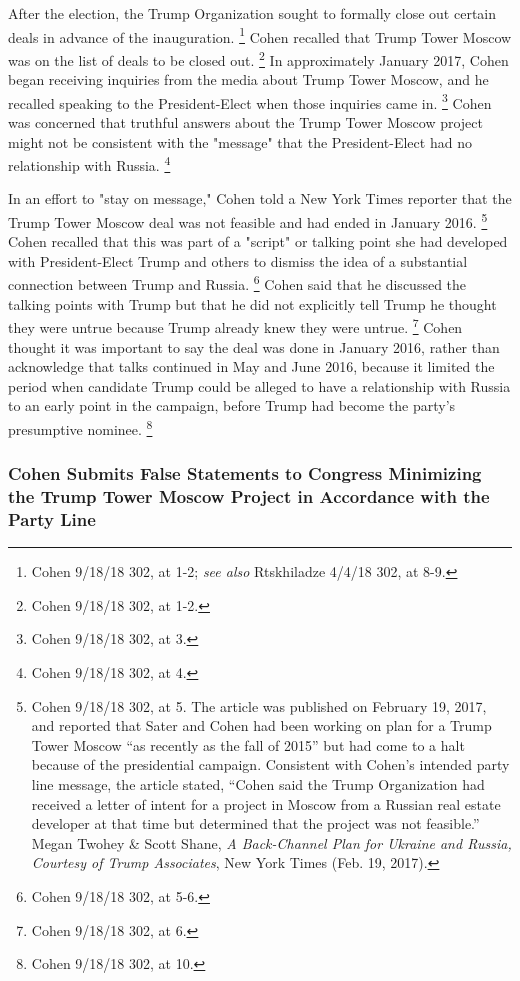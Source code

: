 {After the election, the Trump Organization sought to formally close out certain deals in advance of the inauguration.%
\footnote{Cohen 9/18/18 302, at 1-2;
\textit{see also} Rtskhiladze 4/4/18 302, at 8-9.}
Cohen recalled that Trump Tower Moscow was on the list of deals to be closed out.%
\footnote{Cohen 9/18/18 302, at 1-2.}
In approximately January 2017, Cohen began receiving inquiries from the media about Trump Tower Moscow, and he recalled speaking to the President-Elect when those inquiries came in.%
\footnote{Cohen 9/18/18 302, at 3.}
Cohen was concerned that truthful answers about the Trump Tower Moscow project might not be consistent with the "message" that the President-Elect had no relationship with Russia.%
\footnote{Cohen 9/18/18 302, at 4.}

In an effort to "stay on message," Cohen told a New York Times reporter that the Trump Tower Moscow deal was not feasible and had ended in January 2016.%
\footnote{Cohen 9/18/18 302, at 5.
The article was published on February 19, 2017, and reported that Sater and Cohen had been working on plan for a Trump Tower Moscow “as recently as the fall of 2015” but had come to a halt because of the presidential campaign.
Consistent with Cohen’s intended party line message, the article stated, “Cohen said the Trump Organization had received a letter of intent for a project in Moscow from a Russian real estate developer at that time but determined that the project was not feasible.”
Megan Twohey \& Scott Shane, \textit{A Back-Channel Plan for Ukraine and Russia, Courtesy of Trump Associates}, New York Times (Feb. 19, 2017).}
Cohen recalled that this was part of a "script" or talking point she had developed with President-Elect Trump and others to dismiss the idea of a substantial connection between Trump and Russia.%
\footnote{Cohen 9/18/18 302, at 5-6.}
Cohen said that he discussed the talking points with Trump but that he did not explicitly tell Trump he thought they were untrue because Trump already knew they were untrue.%
\footnote{Cohen 9/18/18 302, at 6.}
Cohen thought it was important to say the deal was done in January 2016, rather than acknowledge that talks continued in May and June 2016, because it limited the period when candidate Trump could be alleged to have a relationship with Russia to an early point in the campaign, before Trump had become the party's presumptive nominee.%
\footnote{Cohen 9/18/18 302, at 10.}

\subsubsection{Cohen Submits False Statements to Congress Minimizing the Trump Tower Moscow Project in Accordance with the Party Line}

}
